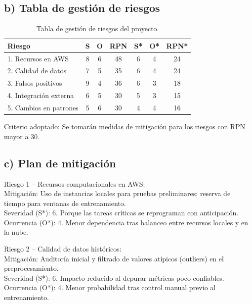 \documentclass[
11pt, %
]{charter}
\begin{document}
\vspace{0.5cm}
\subsection*{b) Tabla de gestión de riesgos}

\begin{table}[H]
\centering
\begin{tabular}{|l|c|c|c|c|c|c|}
\hline
\rowcolor[HTML]{C0C0C0} Riesgo& S & O & RPN & S* & O* & RPN* \\
\hline
1. Recursos en AWS & 8 & 6 & 48 & 6 & 4 & 24 \\\hline
2. Calidad de datos & 7 & 5 & 35 & 6 & 4 & 24 \\\hline
3. Falsos positivos & 9 & 4 & 36 & 6 & 3 & 18 \\\hline
4. Integración externa & 6 & 5 & 30 & 5 & 3 & 15 \\\hline
5. Cambios en patrones & 5 & 6 & 30 & 4 & 4 & 16 \\
\hline
\end{tabular}
\caption{Tabla de gestión de riesgos del proyecto.}
\end{table}

\vspace{0.2cm}
Criterio adoptado: Se tomarán medidas de mitigación para los riesgos con RPN mayor a 30.

\vspace{0.5cm}
\subsection*{c) Plan de mitigación}

Riesgo 1 – Recursos computacionales en AWS: \\
Mitigación: Uso de instancias locales para pruebas preliminares; reserva de tiempo para ventanas de entrenamiento. \\
Severidad (S*): 6. Porque las tareas críticas se reprograman con anticipación. \\
Ocurrencia (O*): 4. Menor dependencia tras balanceo entre recursos locales y en la nube.

\vspace{0.2cm}
Riesgo 2 – Calidad de datos históricos: \\
Mitigación: Auditoría inicial y filtrado de valores atípicos (outliers) en el preprocesamiento. \\
Severidad (S*): 6. Impacto reducido al depurar métricas poco confiables. \\
Ocurrencia (O*): 4. Menor probabilidad tras control manual previo al entrenamiento.
\end{document}

